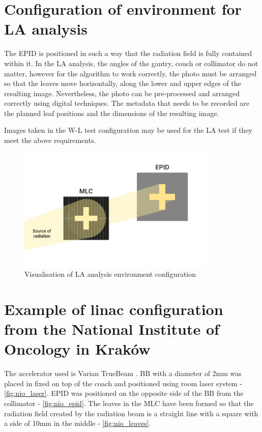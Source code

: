 \section{Configuration of environment for LA analysis}

The EPID is positioned in such a way that the radiation field is fully contained within it. In the LA analysis, the angles of the gantry, couch or collimator do not matter, however for the algorithm to work correctly, the photo must be arranged so that the leaves move horizontally, along the lower and upper edges of the resulting image. Nevertheless, the photo can be pre-processed and arranged correctly using digital techniques. The metadata that needs to be recorded are the planned leaf positions and the dimensions of the resulting image. 

Images taken in the W-L test configuration may be used for the LA test if they meet the above requirements.

\begin{figure}[H]
    \centering
    \includegraphics[width=0.85\textwidth]{Content/Images/LA_visualisation.png}
    \caption{Visualisation of LA analysis environment configuration}
\end{figure}


\section{Example of linac configuration from the National Institute of Oncology in Kraków} \label{sec:envSetupOncologyKrakow}

The accelerator used is Varian TrueBeam \cite{true_beam}. 
BB with a diameter of 2mm was placed in fixed on top of the coach and positioned using room laser system - \autoref{fig:nio_laser}.
EPID was positioned on the opposite side of the BB from the collimator - \autoref{fig:nio_epid}.
The leaves in the MLC have been formed so that the radiation field created by the radiation beam is a straight line with a square with a side of 10mm in the middle - \autoref{fig:nio_leaves}.

